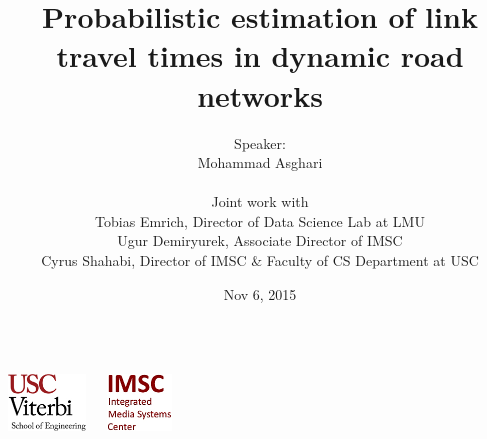 \documentclass[t]{beamer}
\begin{document}
\graphicspath{ {../Manuscript/figures/}{Graphics/} }

\title[USC Viterbi School of Engineering]{Probabilistic estimation of link travel times in dynamic road networks}  
\author[Mohammad Asghari]{\small{Speaker:}\\Mohammad Asghari\\
\vspace{0.05in}
\begin{flushleft}
\tiny{
\hspace{1.25in}Joint work with\\
\hspace{1.25in}Tobias Emrich, Director of Data Science Lab at LMU\\
\hspace{1.25in}Ugur Demiryurek, Associate Director of IMSC\\
\hspace{1.25in}Cyrus Shahabi, Director of IMSC \& Faculty of CS Department at USC}
\end{flushleft}}

\date{Nov 6, 2015} 
\begin{frame}
\titlepage
\vspace{-0.5in}
\begin{columns}
  \begin{center}
    \includegraphics[height=1.5cm]{viterbi_logo.jpg}
  \end{center}
  \begin{center}
    \includegraphics[height=1.5cm]{imsc_logo.jpg}   
  \end{center}
\end{columns} 
\end{frame}
\end{document}
